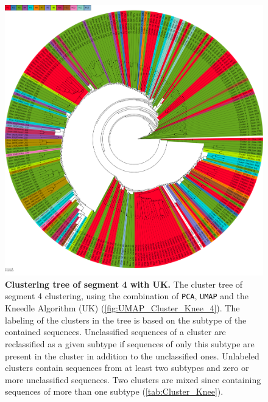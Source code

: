 \begin{figure}[!hbt]
    \centering
    \includegraphics[width=\textwidth]{UMAP/Clustertree_Segment_4_H_Knee.pdf}
    \caption[Clustering tree of segment 4 with UK]{\textbf{Clustering tree of segment 4 with UK.} The cluster tree of segment 4 clustering, using the combination of \texttt{PCA}, \texttt{UMAP} and the Kneedle Algorithm (UK) (\autoref{fig:UMAP_Cluster_Knee_4}). The labeling of the clusters in the tree is based on the subtype of the contained sequences. Unclassified sequences of a cluster are reclassified as a given subtype if sequences of only this subtype are present in the cluster in addition to the unclassified ones. Unlabeled clusters contain sequences from at least two subtypes and zero or more unclassified sequences. Two clusters are mixed since containing sequences of more than one subtype (\autoref{tab:Cluster_Knee}).}
    \label{fig:UMAP_Clusteree_Knee_4}
\end{figure}

